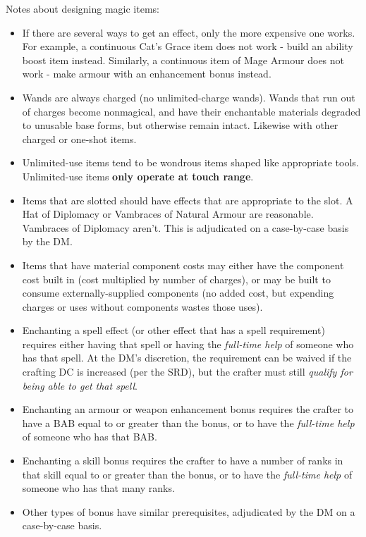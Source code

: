 Notes about designing magic items:
\begin{itemize}
%
\item If there are several ways to get an effect, only the more expensive
one works. For example, a continuous Cat's Grace item does not work - build
an ability boost item instead. Similarly, a continuous item of Mage Armour
does not work - make armour with an enhancement bonus instead.
%
\item Wands are always charged (no unlimited-charge wands). Wands that run
out of charges become nonmagical, and have their enchantable materials
degraded to unusable base forms, but otherwise remain intact. Likewise with
other charged or one-shot items.
%
\item Unlimited-use items tend to be wondrous items shaped like appropriate
tools. Unlimited-use items \textbf{only operate at touch range}.
%
\item Items that are slotted should have effects that are appropriate to the
slot. A Hat of Diplomacy or Vambraces of Natural Armour are reasonable.
Vambraces of Diplomacy aren't. This is adjudicated on a case-by-case basis
by the DM.
%
\item Items that have material component costs may either have the component
cost built in (cost multiplied by number of charges), or may be built to
consume externally-supplied components (no added cost, but expending charges
or uses without components wastes those uses).
%
\item Enchanting a spell effect (or other effect that has a spell
requirement) requires either having that spell or having the
\textit{full-time help} of someone who has that spell. At the DM's
discretion, the requirement can be waived if the crafting DC is increased
(per the SRD), but the crafter must still \textit{qualify for being able to
get that spell}.
%
\item Enchanting an armour or weapon enhancement bonus requires the crafter
to have a BAB equal to or greater than the bonus, or to have the
\textit{full-time help} of someone who has that BAB.
%
\item Enchanting a skill bonus requires the crafter to have a number of
ranks in that skill equal to or greater than the bonus, or to have the
\textit{full-time help} of someone who has that many ranks.
%
\item Other types of bonus have similar prerequisites, adjudicated by the
DM on a case-by-case basis.
%
\end{itemize}

